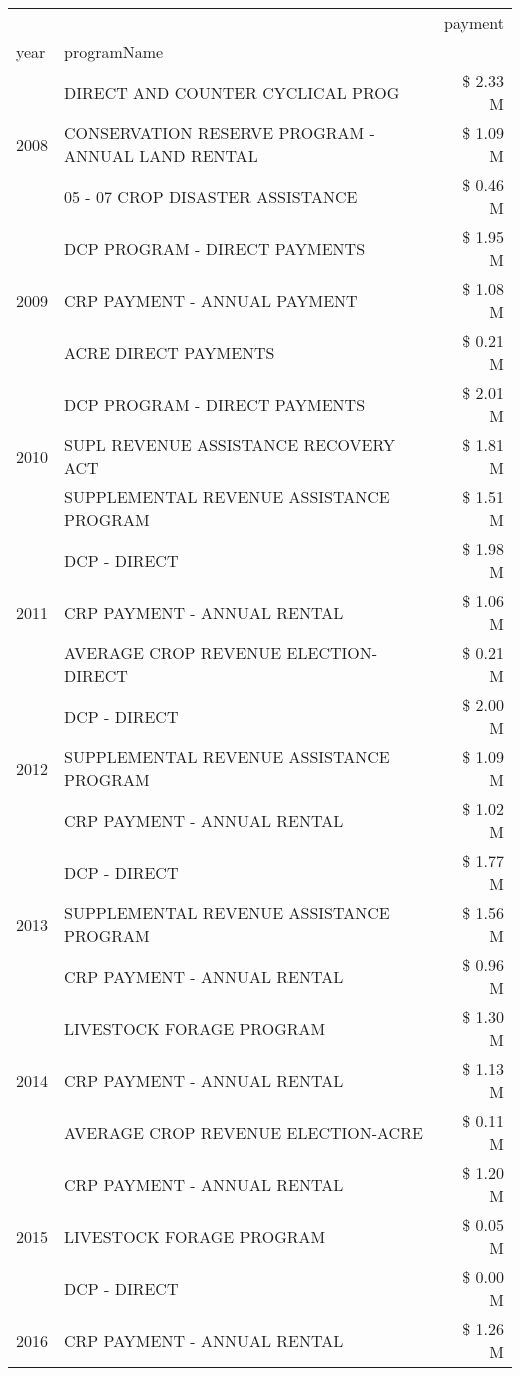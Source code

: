 \begin{tabular}{llr}
\toprule
 &  & payment \\
year & programName &  \\
\midrule
\multirow[t]{3}{*}{2008} & DIRECT AND COUNTER CYCLICAL PROG & \$ 2.33 M \\
 & CONSERVATION RESERVE PROGRAM - ANNUAL LAND RENTAL & \$ 1.09 M \\
 & 05 - 07 CROP DISASTER ASSISTANCE & \$ 0.46 M \\
\cline{1-3}
\multirow[t]{3}{*}{2009} & DCP PROGRAM - DIRECT PAYMENTS & \$ 1.95 M \\
 & CRP PAYMENT - ANNUAL PAYMENT & \$ 1.08 M \\
 & ACRE DIRECT PAYMENTS & \$ 0.21 M \\
\cline{1-3}
\multirow[t]{3}{*}{2010} & DCP PROGRAM - DIRECT PAYMENTS & \$ 2.01 M \\
 & SUPL REVENUE ASSISTANCE RECOVERY ACT & \$ 1.81 M \\
 & SUPPLEMENTAL REVENUE ASSISTANCE PROGRAM & \$ 1.51 M \\
\cline{1-3}
\multirow[t]{3}{*}{2011} & DCP - DIRECT & \$ 1.98 M \\
 & CRP PAYMENT - ANNUAL RENTAL & \$ 1.06 M \\
 & AVERAGE CROP REVENUE ELECTION-DIRECT & \$ 0.21 M \\
\cline{1-3}
\multirow[t]{3}{*}{2012} & DCP - DIRECT & \$ 2.00 M \\
 & SUPPLEMENTAL REVENUE ASSISTANCE PROGRAM & \$ 1.09 M \\
 & CRP PAYMENT - ANNUAL RENTAL & \$ 1.02 M \\
\cline{1-3}
\multirow[t]{3}{*}{2013} & DCP - DIRECT & \$ 1.77 M \\
 & SUPPLEMENTAL REVENUE ASSISTANCE PROGRAM & \$ 1.56 M \\
 & CRP PAYMENT - ANNUAL RENTAL & \$ 0.96 M \\
\cline{1-3}
\multirow[t]{3}{*}{2014} & LIVESTOCK FORAGE PROGRAM & \$ 1.30 M \\
 & CRP PAYMENT - ANNUAL RENTAL & \$ 1.13 M \\
 & AVERAGE CROP REVENUE ELECTION-ACRE & \$ 0.11 M \\
\cline{1-3}
\multirow[t]{3}{*}{2015} & CRP PAYMENT - ANNUAL RENTAL & \$ 1.20 M \\
 & LIVESTOCK FORAGE PROGRAM & \$ 0.05 M \\
 & DCP - DIRECT & \$ 0.00 M \\
\cline{1-3}
\multirow[t]{3}{*}{2016} & CRP PAYMENT - ANNUAL RENTAL & \$ 1.26 M \\

\end{tabular}
